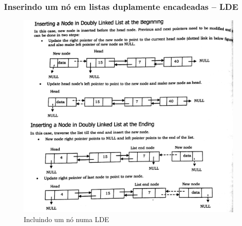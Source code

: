 \begin{frame}%

\frametitle{Inserindo um nó em listas duplamente encadeadas -- LDE}

\begin{figure}[!hb]
	\centering

	\includegraphics[height=0.650\paperheight, width=0.77\paperwidth]{figs/fig_listas/insercao_LDE}						
			\caption{Incluindo um nó numa LDE}	
		\end{figure} 

\end{frame} 




